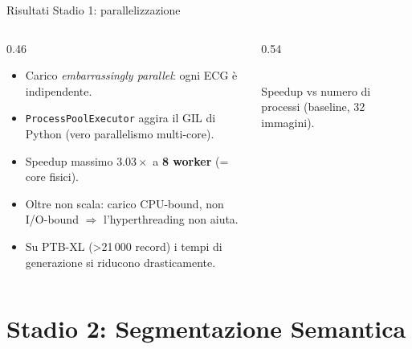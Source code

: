 \documentclass[aspectratio=169,11pt]{beamer}
\begin{document}
\begin{frame}{Risultati Stadio 1: parallelizzazione}
  \begin{columns}[T]
    \begin{column}{0.46\textwidth}
      \begin{itemize}
        \item Carico \alert{\emph{embarrassingly parallel}}: ogni ECG è indipendente.
        \item \texttt{ProcessPoolExecutor} aggira il GIL di Python (vero parallelismo multi-core).
        \item Speedup massimo $\mathbf{3.03\times}$ a \textbf{8 worker} (= core fisici).
        \item Oltre non scala: carico \alert{CPU-bound}, non I/O-bound $\Rightarrow$ l'hyperthreading non aiuta.
        \item Su PTB-XL (>21\,000 record) i tempi di generazione si riducono drasticamente.
      \end{itemize}
    \end{column}
    \begin{column}{0.54\textwidth}
      \centering
      \\
      {\scriptsize Speedup vs numero di processi (baseline, 32 immagini).}
    \end{column}
  \end{columns}
\end{frame}

\section{Stadio 2: Segmentazione Semantica}
\end{document}
